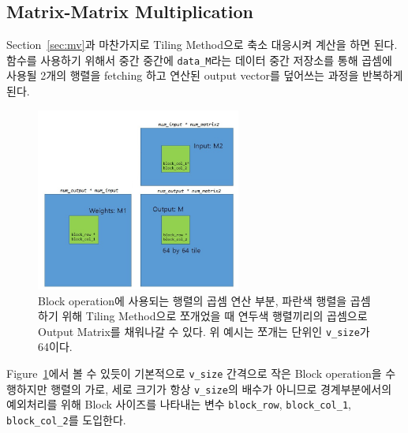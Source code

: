 \documentclass{article}
\begin{document}
\subsection{Matrix-Matrix Multiplication}
Section~\ref{sec:mv}과 마찬가지로 Tiling Method으로 축소 대응시켜 계산을 하면 된다. 함수를 사용하기 위해서 중간 중간에 \texttt{data\_M}라는 데이터 중간 저장소를 통해 곱셈에 사용될 2개의 행렬을 fetching 하고 연산된 output vector를 덮어쓰는 과정을 반복하게 된다. 

\begin{figure}[htb!]
	\centering
	\includegraphics[width=0.6\textwidth]{fig/mm.jpg}
\caption{Block operation에 사용되는 행렬의 곱셈 연산 부분, 파란색 행렬을 곱셈하기 위해 Tiling Method으로 쪼개었을 때 연두색 행렬끼리의 곱셈으로 Output Matrix를 채워나갈 수 있다. 위 예시는 쪼개는 단위인 \texttt{v\_size}가 64이다.}
\label{fig3}
\end{figure}

Figure~\ref{fig3}에서 볼 수 있듯이 기본적으로 \texttt{v\_size} 간격으로 작은 Block operation을 수행하지만 행렬의 가로, 세로 크기가 항상 \texttt{v\_size}의 배수가 아니므로 경계부분에서의 예외처리를 위해 Block 사이즈를 나타내는 변수 \texttt{block\_row},  \texttt{block\_col\_1}, \texttt{block\_col\_2}를 도입한다.
\end{document}

